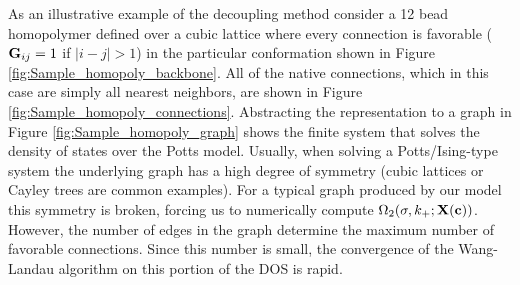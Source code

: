 As an illustrative example of the decoupling method consider a 12 bead homopolymer defined over a cubic lattice where every connection is favorable ($\textbf{G}_{ij} = 1$ if $|i-j| > 1$) in the particular conformation shown in Figure \ref{fig:Sample_homopoly_backbone}. All of the native connections, which in this case are simply all nearest neighbors, are shown in Figure \ref{fig:Sample_homopoly_connections}. Abstracting the representation to a graph in Figure \ref{fig:Sample_homopoly_graph} shows the finite system that solves the density of states over the Potts model. Usually, when solving a Potts/Ising-type system the underlying graph has a high degree of symmetry (cubic lattices or Cayley trees are common examples). For a typical graph produced by our model this symmetry is broken, forcing us to numerically compute $\Omega_2 (\sigma, k_+; \mathbf{X}(\mathbf{c}))$. However, the number of edges in the graph determine the maximum number of favorable connections. Since this number is small, the convergence of the Wang-Landau algorithm on this portion of the DOS is rapid.
